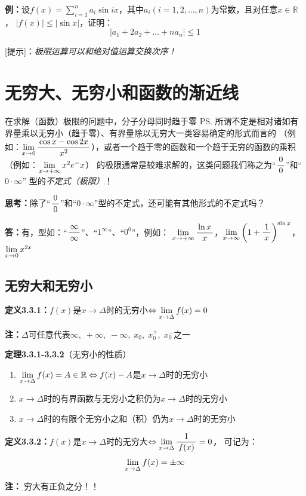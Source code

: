 {\bf 例：}设$f(x)=\sum\limits_{i=1}^na_i\sin
ix$，其中$a_i(i=1,2,\ldots,n)$为常数，且对任意$x\in\mathbb{R}$， $|f(x)|\leq |\sin x|$，证明：
$$\left|a_1+2a_2+\ldots+na_n\right|\leq 1$$

[提示]：{\it 极限运算可以和绝对值运算交换次序！}

\section{无穷大、无穷小和函数的渐近线}

在求解（函数）极限的问题中，分子分母同时趋于零
\ps{所谓不定是相对诸如有界量乘以无穷小（趋于零）、有界量除以无穷大一类容易确定的形式而言的}
（例如：$\lim\limits_{x\to{0}}\displaystyle\frac{\,{\cos
x-\cos2x}\,}{\,{x^2}\,}$），或者一个趋于零的函数和一个趋于无穷的函数的乘积（例如：$\lim\limits_{x\to{+\infty}}x^2e^-x$）
的极限通常是较难求解的，这类问题我们称之为“$\displaystyle\frac{\,{0}\,}{\,{0}\,}$”和“$0\cdot\infty$” 型的{\it 不定式（极限）}！


{\bf 思考：}除了“$\displaystyle\frac{\,{0}\,}{\,{0}\,}$”和“$0\cdot\infty$”型的不定式，还可能有其他形式的不定式吗？

{\bf 答：}有，型如：“$\displaystyle\frac{\,{\infty}\,}{\,{\infty}\,}$”、“$1^{\infty}$”、“$0^0$”，例如：
$\lim\limits_{x\to{+\infty}}\displaystyle\frac{\,{\ln x}\,}{\,{x}\,}$，$\lim\limits_{x\to{\infty}}\left(1+\displaystyle\frac{\,{1}\,}{\,{x}\,}\right)^{\sin
x}$，$\lim\limits_{x\to{0}}x^{2x}$

\subsection{无穷大和无穷小}

{\bf 定义3.3.1：}$f(x)$是$x\to\Delta$时的无穷小$\Leftrightarrow\lim\limits_{x\to{\Delta}}f(x)=0$

{\bf 注：}$\Delta$可任意代表$\infty,\;+\infty,\;-\infty,\;x_0,\;x_0^+,\;x_0^-$之一

{\bf 定理3.3.1-3.3.2}（无穷小的性质）
\begin{enumerate}[(1)]
  \setlength{\itemindent}{1cm}
  \item $\lim\limits_{x\to{\Delta}}f(x)=A\in\mathbb{R}\Leftrightarrow
  f(x)-A$是$x\to\Delta$时的无穷小
  \item $x\to\Delta$时的有界函数与无穷小之积仍为$x\to\Delta$时的无穷小
  \item $x\to\Delta$时的有限个无穷小之和（积）仍为$x\to\Delta$时的无穷小
\end{enumerate}

{\bf 定义3.3.2：}$f(x)$是$x\to\Delta$时的无穷大$\Leftrightarrow\lim\limits_{x\to{\Delta}}\displaystyle\frac{\,{1}\,}{\,{f(x)}\,}=0$，
可记为：
$$\lim\limits_{x\to{\Delta}}f(x)=\pm\infty$$

{\bf 注：}{\b 无穷大有正负之分！！}


